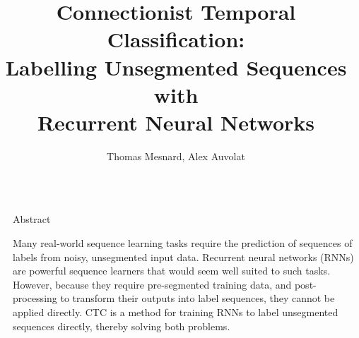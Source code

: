 \documentclass[final]{beamer}
\title{Connectionist Temporal Classification: \\Labelling Unsegmented Sequences with \\Recurrent Neural Networks} %
\author{Thomas Mesnard, Alex Auvolat} %
\institute{Probabilisitc Graphical Models Project, MVA Master} %
\newlength{\sepwid}
\newlength{\onecolwid}
\newlength{\twocolwid}
\begin{document}

\setlength{\belowcaptionskip}{2ex} %
\setlength\belowdisplayshortskip{2ex} %

\begin{frame}[t] %

\begin{columns}[t] %

\begin{column}{\sepwid}\end{column} %

\begin{column}{\twocolwid} %

\begin{columns}[t,totalwidth=\twocolwid] %

\begin{column}{\onecolwid}\vspace{-.6in} %



\begin{block}{Abstract}

Many real-world sequence learning tasks require the prediction of sequences of
labels from noisy, unsegmented input data. Recurrent
neural networks (RNNs) are powerful sequence learners that would seem well
suited to such tasks. However, because they require pre-segmented training
data, and post-processing to transform their outputs into label sequences,
they cannot be applied directly. CTC is a method
for training RNNs to label unsegmented sequences directly, thereby solving both
problems.

\end{block}




\end{column}
\end{columns}
\end{column}
\end{columns}
\end{frame}
\end{document}
